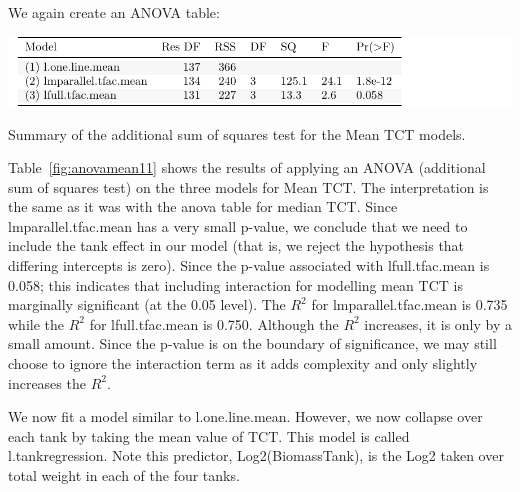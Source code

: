 \newpage

We again create an ANOVA table:

   \vspace{12pt}




\begin{table}[H]
\includegraphics{Chapter3Images/anovamean.pdf}
\caption{\hspace{1mm}Summary of the additional sum of squares test for the Mean TCT models. }
\label{fig:anovamean11}
\end{table}


 
 Table~\ref{fig:anovamean11} shows the results of applying an ANOVA (additional sum of squares test) on the three models for Mean TCT. The interpretation is the same as it was with the anova table for median TCT. Since lmparallel.tfac.mean has a very small p-value, we conclude that we need to include the tank effect in our model (that is, we reject the hypothesis that differing intercepts is zero). 
Since the p-value associated with  lfull.tfac.mean is 0.058; this indicates that including interaction for modelling mean TCT is marginally significant (at the 0.05 level). The $R^{2}$ for lmparallel.tfac.mean is 0.735 while the $R^{2}$ for  lfull.tfac.mean is 0.750. Although the $R^{2}$ increases, it is only by a small amount. Since the p-value is on the boundary of significance, we may still choose to ignore the interaction term as it adds complexity and only slightly increases the $R^{2}$.

\newpage


We now fit a model similar to l.one.line.mean. However, we now collapse over each tank by taking the mean value of TCT. This model is called l.tankregression. Note this predictor, Log2(BiomassTank), is the Log2 taken over total weight in each of the four tanks.

